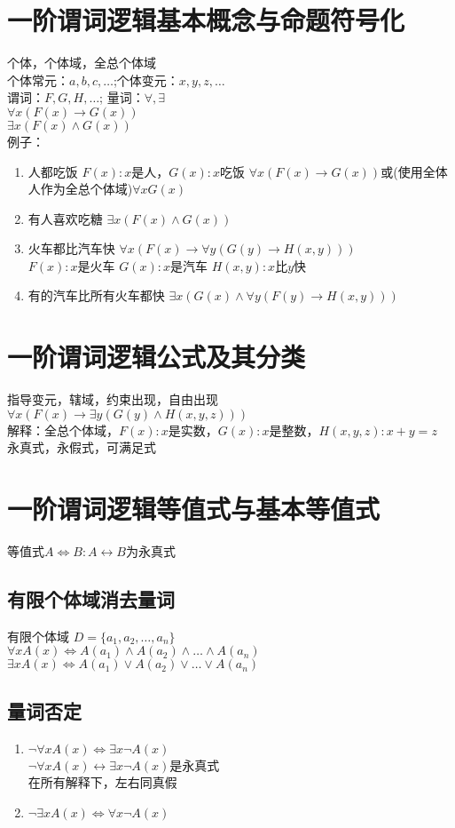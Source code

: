 \documentclass{book}
\newcommand{\Eqv}{\Leftrightarrow}
\newcommand{\eqv}{\leftrightarrow}
\newcommand{\A}{\forall}
\newcommand{\E}{\exists}
\begin{document}
\section{一阶谓词逻辑基本概念与命题符号化}
个体，个体域，全总个体域\\
个体常元：$a,b,c,\dots$;个体变元：$x,y,z,\dots$\\
谓词：$F,G,H,\dots$; 量词：$\A, \E$\\
$\A x(F(x)\to G(x))$\\
$\E x(F(x)\land G(x))$\\
例子：\\
\begin{enumerate}
    \item{人都吃饭}
        $F(x):x$是人，$G(x):x$吃饭 $\A x(F(x)\to G(x))$或(使用全体人作为全总个体域)$\A xG(x)$
    \item{有人喜欢吃糖}
        $\E x(F(x)\land G(x))$
    \item{火车都比汽车快}
        $\A x(F(x)\to \A y(G(y)\to H(x,y)))$\\
    $F(x):x$是火车 $G(x):x$是汽车 $H(x,y):x$比$y$快
    \item{有的汽车比所有火车都快}
        $\E x(G(x)\land \A y(F(y)\to H(x,y)))$
\end{enumerate}
\section{一阶谓词逻辑公式及其分类}
指导变元，辖域，约束出现，自由出现\\
$\A x(F(x)\to \E y(G(y)\land H(x,y,z)))$\\
解释：全总个体域，$F(x):x$是实数，$G(x):x$是整数，$H(x,y,z):x+y=z$\\
永真式，永假式，可满足式
\section{一阶谓词逻辑等值式与基本等值式}
等值式$A\Eqv B: A\eqv B$为永真式
\subsection{有限个体域消去量词}
有限个体域 $D=\{a_1,a_2,\dots,a_n\}$\\
$\A xA(x)\Eqv A(a_1)\land A(a_2)\land \dots \land A(a_n)$\\
$\E xA(x)\Eqv A(a_1)\lor A(a_2)\lor \dots \lor A(a_n)$\\
\subsection{量词否定}
\begin{enumerate}
    \item $\neg\A xA(x)\Eqv \E x\neg A(x)$\\
        $\neg\A xA(x)\eqv\E x\neg A(x)$是永真式\\
        在所有解释下，左右同真假
    \item $\neg\E xA(x)\Eqv\A x\neg A(x)$
\end{enumerate}
\end{document}
